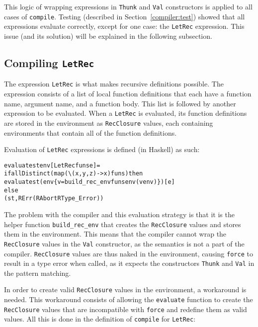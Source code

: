This logic of wrapping expressions in \texttt{Thunk} and \texttt{Val}
constructors is applied to all cases of \texttt{compile}. Testing (described in
Section~\ref{compiler:test}) showed that all
expressions evaluate correctly, except for one case: the \texttt{LetRec}
expression. This issue (and its solution) will be explained in the following
subsection.

\subsection{Compiling \texttt{LetRec}}
\label{com:letrec}
The expression \texttt{LetRec} is what makes recursive definitions possible.
The expression consists of a list of local function definitions that each have a
function name, argument name, and a function body. This list is followed by
another expression to be evaluated. When a \texttt{LetRec} is evaluated, its
function definitions
are stored in the environment as \texttt{RecClosure} values, each containing
environments that contain all of the function definitions.

Evaluation of \texttt{LetRec} expressions is defined (in Haskell) as such:

\begin{alltt}
  evaluate st env [LetRec funs e] =
    if allDistinct (map (\textbackslash(x,y,z) -> x) funs) then
      evaluate st (env \{v = build_rec_env funs env (v env)\}) [e]
    else
      (st, RErr (RAbort RType_Error))
\end{alltt}

\noindent The problem with the compiler and this evaluation strategy is that it
is the helper function \texttt{build\_rec\_env} that
creates the \texttt{RecClosure} values and stores them in the environment. This
means that the compiler cannot wrap the \texttt{RecClosure} values in the
\texttt{Val} constructor, as the semantics is not a part of the compiler.
\texttt{RecClosure} values are thus naked in the environment, causing \texttt{force}
to result in a type error when called, as it expects the constructors
\texttt{Thunk} and \texttt{Val} in the pattern matching.

In order to create valid \texttt{RecClosure} values in the environment, a
workaround is needed. This workaround
consists of allowing the \texttt{evaluate} function to create the
\texttt{RecClosure} values that are incompatible with \texttt{force} and
redefine them as valid values.
All this is done in the definition of
\texttt{compile} for \texttt{LetRec}:

